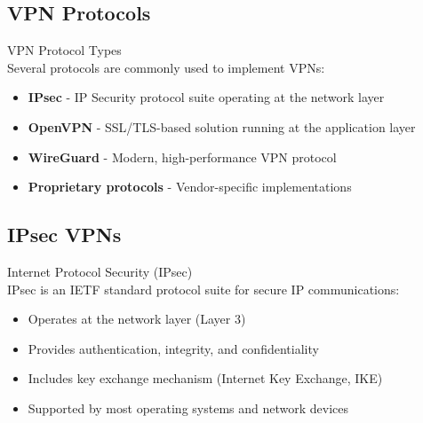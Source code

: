 \subsection{VPN Protocols}

\begin{definition}{VPN Protocol Types}\\
Several protocols are commonly used to implement VPNs:
\begin{itemize}
    \item \textbf{IPsec} - IP Security protocol suite operating at the network layer
    \item \textbf{OpenVPN} - SSL/TLS-based solution running at the application layer
    \item \textbf{WireGuard} - Modern, high-performance VPN protocol
    \item \textbf{Proprietary protocols} - Vendor-specific implementations
\end{itemize}
\end{definition}

\subsection{IPsec VPNs}

\begin{definition}{Internet Protocol Security (IPsec)}\\
IPsec is an IETF standard protocol suite for secure IP communications:
\begin{itemize}
    \item Operates at the network layer (Layer 3)
    \item Provides authentication, integrity, and confidentiality
    \item Includes key exchange mechanism (Internet Key Exchange, IKE)
    \item Supported by most operating systems and network devices
\end{itemize}
\end{definition}

